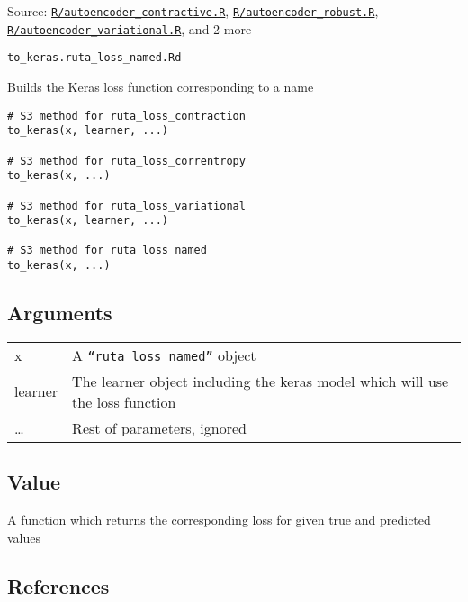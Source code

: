 Source:
\href{https://github.com/fdavidcl/ruta/blob/master/R/autoencoder_contractive.R}{\texttt{R/autoencoder\_contractive.R}},
\href{https://github.com/fdavidcl/ruta/blob/master/R/autoencoder_robust.R}{\texttt{R/autoencoder\_robust.R}},
\href{https://github.com/fdavidcl/ruta/blob/master/R/autoencoder_variational.R}{\texttt{R/autoencoder\_variational.R}},
and 2 more

\texttt{to\_keras.ruta\_loss\_named.Rd}

Builds the Keras loss function corresponding to a name

\begin{verbatim}
# S3 method for ruta_loss_contraction
to_keras(x, learner, ...)

# S3 method for ruta_loss_correntropy
to_keras(x, ...)

# S3 method for ruta_loss_variational
to_keras(x, learner, ...)

# S3 method for ruta_loss_named
to_keras(x, ...)
\end{verbatim}

\hypertarget{arguments}{\subsection{\texorpdfstring{\protect\hyperlink{arguments}{}Arguments}{Arguments}}\label{arguments}}

\begin{longtable}[c]{@{}>{\small}p{3cm}>{\raggedright}p{12.5cm}@{}}
\toprule
x & A \texttt{``ruta\_loss\_named''} object\tabularnewline
learner & The learner object including the keras model which will use
the loss function\tabularnewline
\ldots{} & Rest of parameters, ignored\tabularnewline
\bottomrule
\end{longtable}

\hypertarget{value}{\subsection{\texorpdfstring{\protect\hyperlink{value}{}Value}{Value}}\label{value}}

A function which returns the corresponding loss for given true and
predicted values

\hypertarget{references}{\subsection{\texorpdfstring{\protect\hyperlink{references}{}References}{References}}\label{references}}

